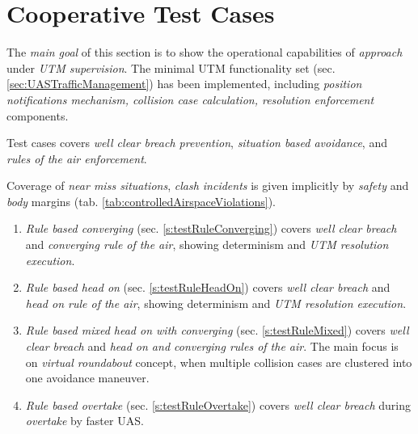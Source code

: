 \section{Cooperative Test Cases}\label{s:cooperativeTestCases}
    
    \noindent The \emph{main goal} of this section is to show the operational capabilities of \emph{approach} under \emph{UTM supervision}. The minimal UTM functionality set (sec. \ref{sec:UASTrafficManagement}) has been implemented, including \emph{position notifications mechanism, collision case calculation, resolution enforcement} components. 
    
    Test cases covers \emph{well clear breach prevention}, \emph{situation based avoidance}, and \emph{rules of the air enforcement}. 
    
    Coverage of \emph{near miss situations}, \emph{clash incidents} is given implicitly by \emph{safety} and \emph{body} margins (tab. \ref{tab:controlledAirspaceViolations}).
    
    \begin{enumerate}
        \item \emph{Rule based converging} (sec. \ref{s:testRuleConverging}) covers \emph{well clear breach} and \emph{converging rule of the air}, showing determinism and \emph{UTM resolution execution}.
        
        \item \emph{Rule based head on} (sec. \ref{s:testRuleHeadOn}) covers \emph{well clear breach} and \emph{head on rule of the air}, showing determinism and \emph{UTM resolution execution}.
        
        \item \emph{Rule based mixed head on with converging} (sec. \ref{s:testRuleMixed}) covers \emph{well clear breach} and \emph{head on and converging rules of the air}. The main focus is on \emph{virtual roundabout} concept, when multiple collision cases are clustered into one avoidance maneuver. 
        
        \item \emph{Rule based overtake} (sec. \ref{s:testRuleOvertake}) covers \emph{well clear breach} during \emph{overtake} by faster UAS.
    \end{enumerate}

